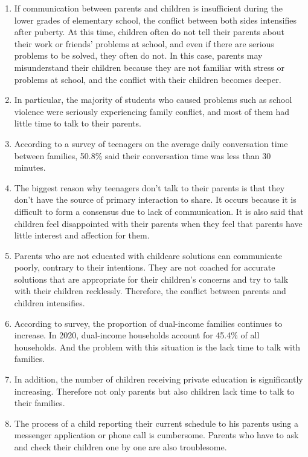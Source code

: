 \documentclass[conference]{IEEEtran}
\begin{document}
\begin{enumerate}
  \item If communication between parents and children is insufficient during the lower grades of elementary school, the conflict between both sides intensifies after puberty. At this time, children often do not tell their parents about their work or friends' problems at school, and even if there are serious problems to be solved, they often do not. In this case, parents may misunderstand their children because they are not familiar with stress or problems at school, and the conflict with their children becomes deeper.
  
  \item In particular, the majority of students who caused problems such as school violence were seriously experiencing family conflict, and most of them had little time to talk to their parents.
  
  \item According to a survey of teenagers on the average daily conversation time between families, 50.8\% said their conversation time was less than 30 minutes. 
  
  \item The biggest reason why teenagers don't talk to their parents is that they don't have the source of primary interaction to share. It occurs because it is difficult to form a consensus due to lack of communication. It is also said that children feel disappointed with their parents when they feel that parents have little interest and affection for them.

  \item Parents who are not educated with childcare solutions can communicate poorly, contrary to their intentions. They are not coached for accurate solutions that are appropriate for their children's concerns and try to talk with their children recklessly. Therefore, the conflict between parents and children intensifies.
  
  \item According to survey, the proportion of dual-income families continues to increase. In 2020, dual-income households account for 45.4\% of all households. And the problem with this situation is the lack time to talk with families.
  
  \item In addition, the number of children receiving private education is significantly increasing. Therefore not only parents but also children lack time to talk to their families.
  
  \item The process of a child reporting their current schedule to his parents using a messenger application or phone call is cumbersome. Parents who have to ask and check their children one by one are also troublesome.
\end{enumerate}
\end{document}
